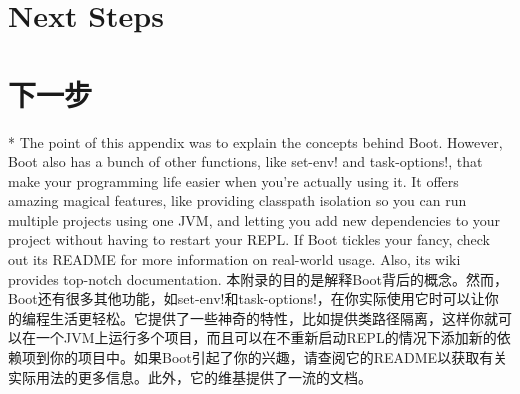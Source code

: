 \begin{paracol}{2}
\section{Next Steps}
\switchcolumn
\section{下一步}

\switchcolumn[0]*
The point of this appendix was to explain the concepts behind Boot.
However, Boot also has a bunch of other functions, like set-env! and
task-options!, that make your programming life easier when you're
actually using it. It offers amazing magical features, like providing
classpath isolation so you can run multiple projects using one JVM, and
letting you add new dependencies to your project without having to
restart your REPL. If Boot tickles your fancy, check out its README for
more information on real-world usage. Also, its wiki provides top-notch
documentation.
\switchcolumn
本附录的目的是解释Boot背后的概念。然而，Boot还有很多其他功能，如set-env!和task-options!，在你实际使用它时可以让你的编程生活更轻松。它提供了一些神奇的特性，比如提供类路径隔离，这样你就可以在一个JVM上运行多个项目，而且可以在不重新启动REPL的情况下添加新的依赖项到你的项目中。如果Boot引起了你的兴趣，请查阅它的README以获取有关实际用法的更多信息。此外，它的维基提供了一流的文档。
\end{paracol}
